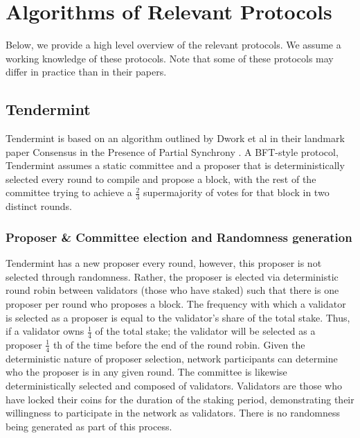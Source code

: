 \documentclass[10pt,journal,compsoc]{IEEEtran}
\begin{document}
\section{Algorithms of Relevant Protocols}
Below, we provide a high level overview of the relevant protocols. We assume a working knowledge of these protocols. Note that some of these protocols may differ in practice than in their papers.
 
\subsection{Tendermint}
Tendermint \cite{Buchman} is based on an algorithm outlined by Dwork et al in their landmark paper Consensus in the Presence of Partial Synchrony \cite{DworkEtAl}. A BFT-style protocol, Tendermint assumes a static committee and a proposer that is deterministically selected every round to compile and propose a block, with the rest of the committee trying to achieve a \(\frac{2}{3}\) supermajority of votes for that block in two distinct rounds. 
  
\subsubsection{Proposer \& Committee election and Randomness   generation}
Tendermint has a new proposer every round, however, this proposer is not selected through randomness. Rather, the proposer is elected via deterministic round robin between validators (those who have staked) such that there is one proposer per round who proposes a block. The frequency with which a validator is selected as a proposer is equal to the validator's share of the total stake. Thus, if a validator owns \(\frac{1}{4}\) of the total stake; the validator will be selected as a proposer \(\frac{1}{4}\) th of the time before the end of the round robin. Given the deterministic nature of proposer selection, network participants can determine who the proposer is in any given round.
The committee is likewise deterministically selected and composed of validators. Validators are those who have locked their coins for the duration of the staking period, demonstrating their willingness to participate in the network as validators. There is no randomness being generated as part of this process.
\end{document}
